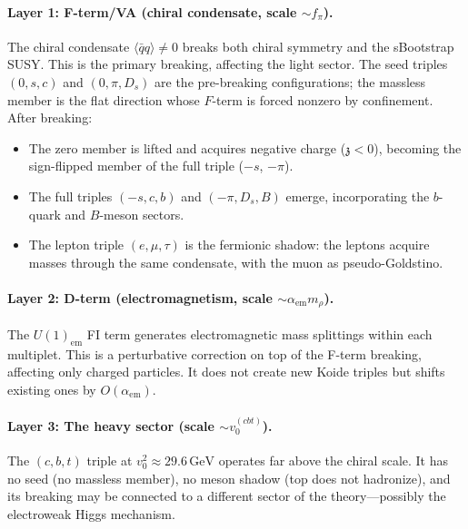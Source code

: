 \documentclass[12pt,a4paper]{article}
\newcommand{\GeV}{\,\text{GeV}}
\newcommand{\qqbar}{\langle\bar{q}q\rangle}
\newcommand{\zch}{\mathfrak{z}}
\begin{document}
\paragraph{Layer 1: F-term/VA (chiral condensate, scale $\sim f_\pi$).}
The chiral condensate $\qqbar \neq 0$ breaks both chiral symmetry 
and the sBootstrap SUSY. This is the primary breaking, affecting 
the light sector. The seed triples $(0, s, c)$ and $(0, \pi, D_s)$ 
are the pre-breaking configurations; the massless member is the flat 
direction whose $F$-term is forced nonzero by confinement. After 
breaking:
\begin{itemize}
\item The zero member is lifted and acquires negative charge 
($\zch < 0$), becoming the sign-flipped member of the full triple 
($-s$, $-\pi$).
\item The full triples $(-s,c,b)$ and $(-\pi, D_s, B)$ emerge, 
incorporating the $b$-quark and $B$-meson sectors.
\item The lepton triple $(e, \mu, \tau)$ is the fermionic shadow: 
the leptons acquire masses through the same condensate, with the 
muon as pseudo-Goldstino.
\end{itemize}

\paragraph{Layer 2: D-term (electromagnetism, scale $\sim \alpha_{\text{em}} m_\rho$).}
The $U(1)_{\text{em}}$ FI term generates electromagnetic mass 
splittings within each multiplet. This is a perturbative correction 
on top of the F-term breaking, affecting only charged particles. 
It does not create new Koide triples but shifts existing ones by 
$O(\alpha_{\text{em}})$.

\paragraph{Layer 3: The heavy sector (scale $\sim v_0^{(cbt)}$).}
The $(c,b,t)$ triple at $v_0^2 \approx 29.6\GeV$ operates far 
above the chiral scale. It has no seed (no massless member), no 
meson shadow (top does not hadronize), and its breaking may be 
connected to a different sector of the theory---possibly the 
electroweak Higgs mechanism.
\end{document}
